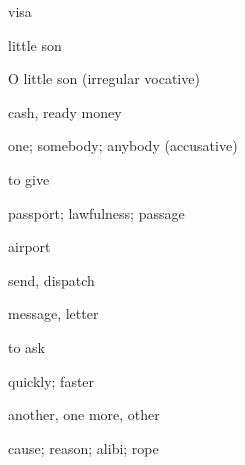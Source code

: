 \documentclass[avery5371,grid,frame]{flashcards}
\begin{document}
\begin{flashcard}{\LARGE visa}
\LARGE {}
\end{flashcard}
\begin{flashcard}{\LARGE little son}
\LARGE {}
\end{flashcard}
\begin{flashcard}{\LARGE O little son (irregular vocative)}
\LARGE {}
\end{flashcard}
\begin{flashcard}{\LARGE cash, ready money}
\LARGE {}
\end{flashcard}
\begin{flashcard}{\LARGE one; somebody; anybody (accusative)}
\LARGE {}
\end{flashcard}
\begin{flashcard}{\LARGE to give}
\LARGE {}
\end{flashcard}
\begin{flashcard}{\LARGE passport; lawfulness; passage}
\LARGE {}
\end{flashcard}
\begin{flashcard}{\LARGE airport}
\LARGE {}
\end{flashcard}
\begin{flashcard}{\LARGE send, dispatch}
\LARGE {}
\end{flashcard}
\begin{flashcard}{\LARGE message, letter}
\LARGE {}
\end{flashcard}
\begin{flashcard}{\LARGE to ask}
\LARGE {}
\end{flashcard}
\begin{flashcard}{\LARGE quickly; faster}
\LARGE {}
\end{flashcard}
\begin{flashcard}{\LARGE another, one more, other}
\LARGE {}
\end{flashcard}
\begin{flashcard}{\LARGE cause; reason; alibi; rope}
\LARGE {}
\end{flashcard}
\end{document}
